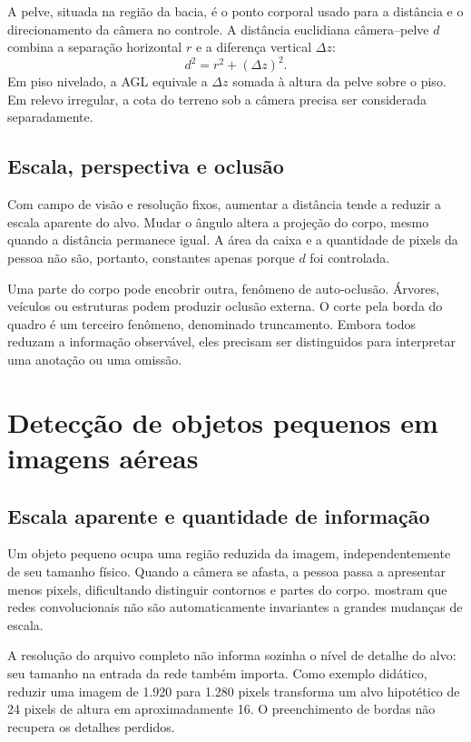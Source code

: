 A pelve, situada na região da bacia, é o ponto corporal usado para a distância e o direcionamento da câmera no controle. A distância euclidiana câmera--pelve $d$ combina a separação horizontal $r$ e a diferença vertical $\Delta z$:
\begin{equation}
d^2=r^2+(\Delta z)^2.
\end{equation}
Em piso nivelado, a AGL equivale a $\Delta z$ somada à altura da pelve sobre o piso. Em relevo irregular, a cota do terreno sob a câmera precisa ser considerada separadamente.

\subsection{Escala, perspectiva e oclusão}
Com campo de visão e resolução fixos, aumentar a distância tende a reduzir a escala aparente do alvo. Mudar o ângulo altera a projeção do corpo, mesmo quando a distância permanece igual. A área da caixa e a quantidade de pixels da pessoa não são, portanto, constantes apenas porque $d$ foi controlada.

Uma parte do corpo pode encobrir outra, fenômeno de auto-oclusão. Árvores, veículos ou estruturas podem produzir oclusão externa. O corte pela borda do quadro é um terceiro fenômeno, denominado truncamento. Embora todos reduzam a informação observável, eles precisam ser distinguidos para interpretar uma anotação ou uma omissão.

\FloatBarrier
\section{Detecção de objetos pequenos em imagens aéreas}
\label{sec:objetos-pequenos}
\subsection{Escala aparente e quantidade de informação}
Um objeto pequeno ocupa uma região reduzida da imagem, independentemente de seu tamanho físico. Quando a câmera se afasta, a pessoa passa a apresentar menos pixels, dificultando distinguir contornos e partes do corpo.  mostram que redes convolucionais não são automaticamente invariantes a grandes mudanças de escala.

A resolução do arquivo completo não informa sozinha o nível de detalhe do alvo: seu tamanho na entrada da rede também importa. Como exemplo didático, reduzir uma imagem de 1.920 para 1.280 pixels transforma um alvo hipotético de 24 pixels de altura em aproximadamente 16. O preenchimento de bordas não recupera os detalhes perdidos.

